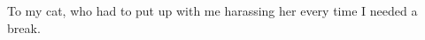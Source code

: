 \leavevmode\vfill
To my cat, who had to put up with me harassing her every time I needed a break.
\vfill